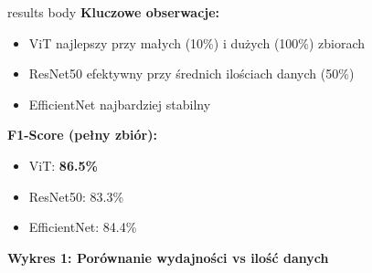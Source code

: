 \documentclass[final]{beamer}
\begin{document}
\begin{frame}[t]
\begin{columns}[T]
\begin{column}{.48\linewidth}
{\begin{beamercolorbox}[wd=\linewidth,dp=0.3cm]{results body}
                \vspace{0.1cm}
                \textbf{Kluczowe obserwacje:}
                \begin{itemize}
                    \item ViT najlepszy przy małych (10\%) i dużych (100\%) zbiorach
                    \item ResNet50 efektywny przy średnich ilościach danych (50\%)
                    \item EfficientNet najbardziej stabilny
                \end{itemize}
                
                \vspace{0.1cm}
                \textbf{F1-Score (pełny zbiór):}
                \begin{itemize}
                    \item ViT: \textbf{86.5\%} \quad 
                    \item ResNet50: 83.3\%
                    \item EfficientNet: 84.4\%
                \end{itemize}
                
                \vspace{0.1cm}
                \textbf{Wykres 1: Porównanie wydajności vs ilość danych}
                \vspace{0.05cm}
                

\end{beamercolorbox}}
\end{column}
\end{columns}
\end{frame}
\end{document}
